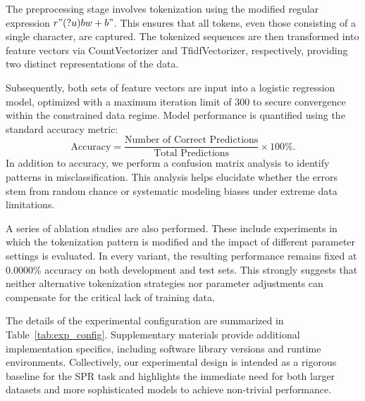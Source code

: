 \documentclass{article}
\begin{document}
The preprocessing stage involves tokenization using the modified regular expression \( r"(?u)\\b\\w+\\b" \). This ensures that all tokens, even those consisting of a single character, are captured. The tokenized sequences are then transformed into feature vectors via CountVectorizer and TfidfVectorizer, respectively, providing two distinct representations of the data.

Subsequently, both sets of feature vectors are input into a logistic regression model, optimized with a maximum iteration limit of 300 to secure convergence within the constrained data regime. Model performance is quantified using the standard accuracy metric:
\[
\text{Accuracy} = \frac{\text{Number of Correct Predictions}}{\text{Total Predictions}} \times 100\%.
\]
In addition to accuracy, we perform a confusion matrix analysis to identify patterns in misclassification. This analysis helps elucidate whether the errors stem from random chance or systematic modeling biases under extreme data limitations.

A series of ablation studies are also performed. These include experiments in which the tokenization pattern is modified and the impact of different parameter settings is evaluated. In every variant, the resulting performance remains fixed at 0.0000\% accuracy on both development and test sets. This strongly suggests that neither alternative tokenization strategies nor parameter adjustments can compensate for the critical lack of training data.

The details of the experimental configuration are summarized in Table~\ref{tab:exp_config}. Supplementary materials provide additional implementation specifics, including software library versions and runtime environments. Collectively, our experimental design is intended as a rigorous baseline for the SPR task and highlights the immediate need for both larger datasets and more sophisticated models to achieve non-trivial performance.
\end{document}
